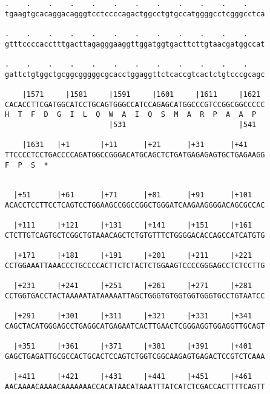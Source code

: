 \documentclass{article}
\begin{document}
\begin{Verbatim}
.    .    .    .    .    .    .    .    .    .    .    .    
tgaagtgcacaggacagggtcctccccagactggcctgtgccatggggcctcgggcctca
                                                            
.    .    .    .    .    .    .    .    .    .    .    .    
gtttccccacctttgacttagagggaaggttggatggtgacttcttgtaacgatggccat
                                                            
.    .    .    .    .    .    .    .    .    .    .    .    
gattctgtggctgcggcgggggcgcacctggaggttctcaccgtcactctgtcccgcagc
                                                            
    |1571     |1581     |1591     |1601     |1611     |1621 
CACACCTTCGATGGCATCCTGCAGTGGGCCATCCAGAGCATGGCCCGTCCGGCGGCCCCC
H  T  F  D  G  I  L  Q  W  A  I  Q  S  M  A  R  P  A  A  P  
                        |531                          |541  
  
    |1631   |+1       |+11      |+21      |+31      |+41    
TTCCCCTCCTGACCCCAGATGGCCGGGACATGCAGCTCTGATGAGAGAGTGCTGAGAAGG
F  P  S  *   
                                                            
  
  |+51      |+61      |+71      |+81      |+91      |+101   
ACACCTCCTTCCTCAGTCCTGGAAGCCGGCCGGCTGGGATCAAGAAGGGGACAGCGCCAC
                                                            
  |+111     |+121     |+131     |+141     |+151     |+161   
CTCTTGTCAGTGCTCGGCTGTAAACAGCTCTGTGTTTCTGGGGACACCAGCCATCATGTG
                                                            
  |+171     |+181     |+191     |+201     |+211     |+221   
CCTGGAAATTAAACCCTGCCCCACTTCTCTACTCTGGAAGTCCCCGGGAGCCTCTCCTTG
                                                            
  |+231     |+241     |+251     |+261     |+271     |+281   
CCTGGTGACCTACTAAAAATATAAAAATTAGCTGGGTGTGGTGGTGGGTGCCTGTAATCC
                                                            
  |+291     |+301     |+311     |+321     |+331     |+341   
CAGCTACATGGGAGCCTGAGGCATGAGAATCACTTGAACTCGGGAGGTGGAGGTTGCAGT
                                                            
  |+351     |+361     |+371     |+381     |+391     |+401   
GAGCTGAGATTGCGCCACTGCACTCCAGTCTGGTCGGCAAGAGTGAGACTCCGTCTCAAA
                                                            
  |+411     |+421     |+431     |+441     |+451     |+461   
AACAAAACAAAACAAAAAAACCACATAACATAAATTTATCATCTCGACCACTTTTCAGTT
                                                            

\end{Verbatim}
\end{document}
